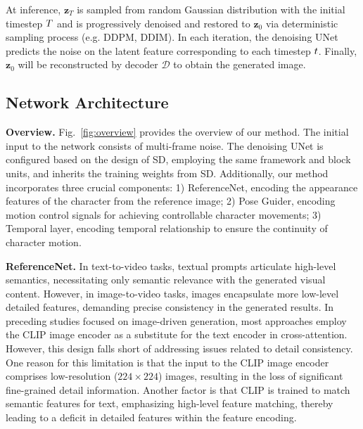 At inference, ${\mathbf z}_{T}$ is sampled from random Gaussian distribution with the initial timestep $\mathnormal T$ and is progressively denoised and restored to ${\mathbf z}_{0}$ via deterministic sampling process (e.g. DDPM\cite{denoising}, DDIM\cite{ddim}). 
In each iteration, the denoising UNet predicts the noise on the latent feature corresponding to each timestep $\mathnormal t$. 
Finally, ${\mathbf z}_{0}$ will be reconstructed by decoder $\mathcal D$ to obtain the generated image. 

\subsection{Network Architecture}\label{sec:net}

\noindent
\textbf{Overview. }
Fig.~\ref{fig:overview} provides the overview of our method. The initial input to the network consists of multi-frame noise. The denoising UNet is configured based on the design of SD, employing the same framework and block units, and inherits the training weights from SD. Additionally, our method incorporates three crucial components: 1) ReferenceNet, encoding the appearance features of the character from the reference image; 2) Pose Guider, encoding motion control signals for achieving controllable character movements; 3) Temporal layer, encoding temporal relationship to ensure the continuity of character motion.

\noindent
\textbf{ReferenceNet. }
In text-to-video tasks, textual prompts articulate high-level semantics, necessitating only semantic relevance with the generated visual content. However, in image-to-video tasks, images encapsulate more low-level detailed features, demanding precise consistency in the generated results. In preceding studies focused on image-driven generation, most approaches\cite{ip,objectstitch,paint,dreampose,disco,videocrafter1} employ the CLIP image encoder as a substitute for the text encoder in cross-attention. However, this design falls short of addressing issues related to detail consistency. One reason for this limitation is that the input to the CLIP image encoder comprises low-resolution ($224{\times}224$) images, resulting in the loss of significant fine-grained detail information. Another factor is that CLIP is trained to match semantic features for text, emphasizing high-level feature matching, thereby leading to a deficit in detailed features within the feature encoding.

